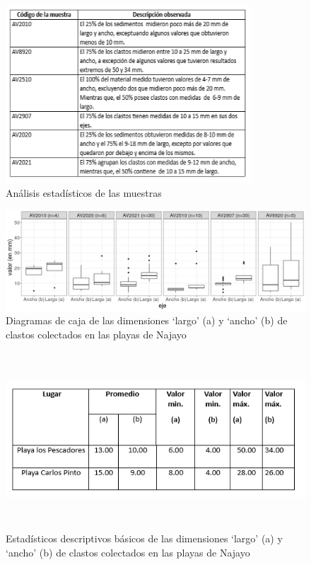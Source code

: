 \documentclass[11pt,]{article}
\begin{document}
\begin{figure}
\centering
\includegraphics[height=2.60417in]{resultados_estadisticos.png}
\caption{Análisis estadísticos de las muestras\label{estadistico}}
\end{figure}

\begin{figure}
\centering
\includegraphics{muestra_graf.png}
\caption{Diagramas de caja de las dimensiones `largo' (a) y `ancho' (b)
de clastos colectados en las playas de Najayo\label{grafico}}
\end{figure}

\begin{figure}
\centering
\includegraphics[height=2.60417in]{tabla_lugar.png}
\caption{Estadísticos descriptivos básicos de las dimensiones `largo'
(a) y `ancho' (b) de clastos colectados en las playas de
Najayo\label{lugar}}
\end{figure}
\end{document}
